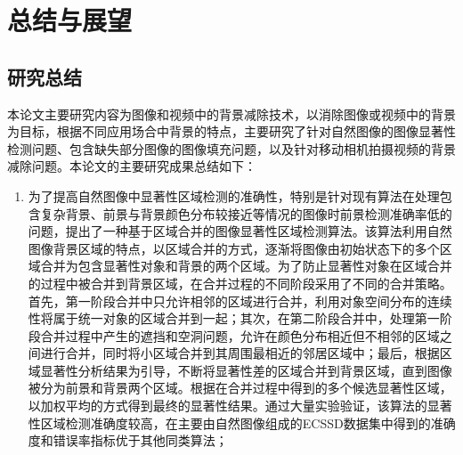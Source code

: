 \chapter{总结与展望}
\label{ch6:Summary}

\section{研究总结}
\label{ch6:sec:summary}
本论文主要研究内容为图像和视频中的背景减除技术，以消除图像或视频中的背景为目标，根据不同应用场合中背景的特点，主要研究了针对自然图像的图像显著性检测问题、包含缺失部分图像的图像填充问题，以及针对移动相机拍摄视频的背景减除问题。本论文的主要研究成果总结如下：
\begin{enumerate}
  \item 为了提高自然图像中显著性区域检测的准确性，特别是针对现有算法在处理包含复杂背景、前景与背景颜色分布较接近等情况的图像时前景检测准确率低的问题，提出了一种基于区域合并的图像显著性区域检测算法。该算法利用自然图像背景区域的特点，以区域合并的方式，逐渐将图像由初始状态下的多个区域合并为包含显著性对象和背景的两个区域。为了防止显著性对象在区域合并的过程中被合并到背景区域，在合并过程的不同阶段采用了不同的合并策略。首先，第一阶段合并中只允许相邻的区域进行合并，利用对象空间分布的连续性将属于统一对象的区域合并到一起；其次，在第二阶段合并中，处理第一阶段合并过程中产生的遮挡和空洞问题，允许在颜色分布相近但不相邻的区域之间进行合并，同时将小区域合并到其周围最相近的邻居区域中；最后，根据区域显著性分析结果为引导，不断将显著性差的区域合并到背景区域，直到图像被分为前景和背景两个区域。根据在合并过程中得到的多个候选显著性区域，以加权平均的方式得到最终的显著性结果。通过大量实验验证，该算法的显著性区域检测准确度较高，在主要由自然图像组成的ECSSD数据集中得到的准确度和错误率指标优于其他同类算法；


\end{enumerate}
